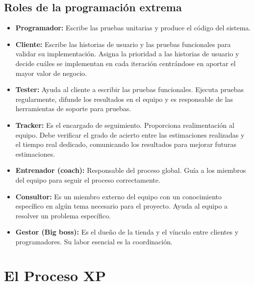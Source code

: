 

     \subsection{Roles de la programación extrema}
     \label{sub:roles_xp}


     \begin{itemize}
       \item \textbf{Programador:} Escribe las pruebas unitarias y produce el código del sistema.
       \item \textbf{Cliente:} Escribe las historias de usuario y las pruebas funcionales para validar su implementación. Asigna la prioridad a las historias de usuario y decide cuáles se implementan en cada iteración centrándose en aportar el mayor valor de negocio.
       \item \textbf{Tester:} Ayuda al cliente a escribir las pruebas funcionales. Ejecuta pruebas regularmente, difunde los resultados en el equipo y es responsable de las herramientas de soporte para pruebas.
       \item \textbf{Tracker:} Es el encargado de seguimiento. Proporciona realimentación al equipo. Debe verificar el grado de acierto entre las estimaciones realizadas y el tiempo real dedicado, comunicando los resultados para mejorar futuras estimaciones.
       \item \textbf{Entrenador (coach):} Responsable del proceso global. Guía a los miembros del equipo para seguir el proceso correctamente.
       \item \textbf{Consultor:} Es un miembro externo del equipo con un conocimiento específico en algún tema necesario para el proyecto. Ayuda al equipo a resolver un problema específico.
       \item \textbf{Gestor (Big boss):} Es el dueño de la tienda y el vínculo entre clientes y programadores. Su labor esencial es la coordinación.
     \end{itemize}



     \section{El Proceso XP} %
     \label{sec:Proceso XP}


